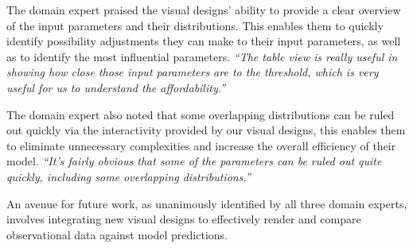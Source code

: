 The domain expert praised the visual designs' ability to provide a clear overview of the input parameters and their distributions. This enables them to quickly identify possibility adjustments they can make to their input parameters, as well as to identify the most influential parameters.
\textit{
``The table view is really useful in showing how close those input parameters are to the threshold, which is very useful for us to understand the affordability.''
}

The domain expert also noted that some overlapping distributions can be ruled out quickly via the interactivity provided by our visual designs, this enables them to eliminate unnecessary complexities and increase the overall efficiency of their model.
\textit{
``It's fairly obvious that some of the parameters can be ruled out quite quickly, including some overlapping distributions.''
}

An avenue for future work, as unanimously identified by all three domain experts, involves integrating new visual designs to effectively render and compare observational data against model predictions.
